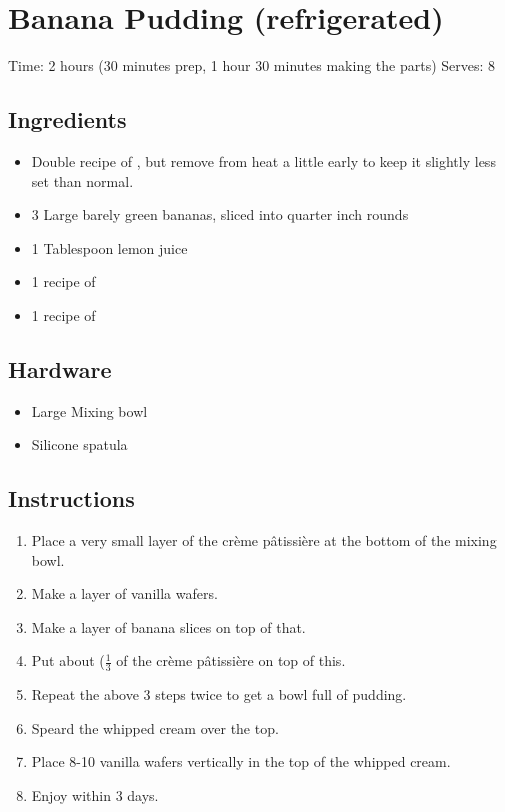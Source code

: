 \section{Banana Pudding (refrigerated)}
\label{bananaPudding}
\setcounter{secnumdepth}{0}
Time: 2 hours (30 minutes prep, 1 hour 30 minutes making the parts)
Serves: 8

\begin{multicols}{2}
\subsection*{Ingredients}
\begin{itemize}
    \item Double recipe of , but remove from heat a little early to keep it slightly less set than normal.
    \item 3 Large barely green bananas, sliced into quarter inch rounds
    \item 1 Tablespoon lemon juice
    \item 1 recipe of 
    \item 1 recipe of 
\end{itemize}

\subsection*{Hardware}
\begin{itemize}
    \item Large Mixing bowl
    \item Silicone spatula
\end{itemize}
\clearpage

\subsection*{Instructions}
\begin{enumerate}
    \item Place a very small layer of the crème pâtissière at the bottom of the mixing bowl.
    \item Make a layer of vanilla wafers.
    \item Make a layer of banana slices on top of that.
    \item Put about (\( \frac{1}{3} \) of the crème pâtissière on top of this.
    \item Repeat the above 3 steps twice to get a bowl full of pudding.
    \item Speard the whipped cream over the top.
    \item Place 8-10 vanilla wafers vertically in the top of the whipped cream.
    \item Enjoy within 3 days.
\end{enumerate}


\end{multicols}
